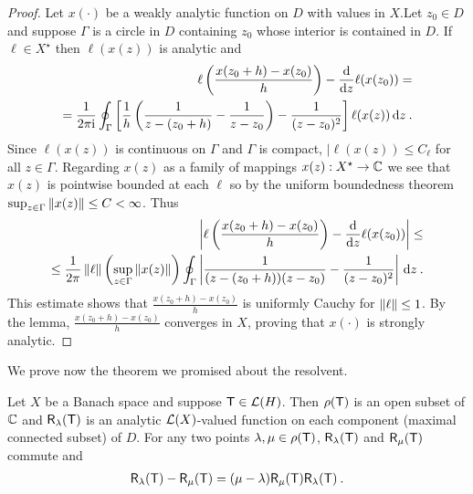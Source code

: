 \begin{proof}
    Let $x(\cdot)$ be a weakly analytic function on $D$ with values in $X$.Let $z_0 \in D$ and suppose $\Gamma$ is a circle in $D$ containing $z_0$ whose interior is contained in $D$. If $\ell \in X^\star$ then $\ell(x(z))$ is analytic and
    \begin{align}
        \ell \left( \frac{x(z_0+h)-x(z_0)}{h}\right) - \frac{\mathrm{d}}{\mathrm{d}z} \ell(x(z_0)) = \\
        = \frac{1}{2 \pi \mathrm{i}} \oint_\Gamma \left[ \frac{1}{h} \left( \frac{1}{z-(z_0+h)} - \frac{1}{z-z_0} \right) - \frac{1}{(z-z_0)^2} \right] \ell (x(z)) \, \mathrm{d} z \:.
    \end{align}
    Since $\ell(x(z))$ is continuous on $\Gamma$ and $\Gamma$ is compact, $|\ell(x(z)) \leq C_\ell$ for all $z \in \Gamma$. Regarding $x(z)$ as a family of mappings $x(z) : X^\star \to \mathbb{C}$ we see that $x(z)$ is pointwise bounded at each $\ell$ so by the uniform boundedness theorem $\sup_{z \in \Gamma} \left \Vert x(z) \right \Vert \leq C < \infty$. Thus \begin{align}
        \left| \ell \left( \frac{x(z_0+h)-x(z_0)}{h}\right) - \frac{\mathrm{d}}{\mathrm{d}z} \ell(x(z_0)) \right| \leq \\
        \leq \frac{1}{2 \pi} \left \Vert \ell \right \Vert \left( \sup_{z \in \Gamma} \left \Vert x(z) \right \Vert \right) \oint_\Gamma \left| \frac{1}{(z-(z_0+h))(z-z_0)} - \frac{1}{(z-z_0)^2}\right| \, \mathrm{d} z \:.
    \end{align}
    This estimate shows that $\frac{x(z_0+h)-x(z_0)}{h}$ is uniformly Cauchy for $\left \Vert \ell \right \Vert \leq 1$. By the lemma, $\frac{x(z_0+h)-x(z_0)}{h}$ converges in $X$, proving that $x(\cdot)$ is strongly analytic.
\end{proof}

We prove now the theorem we promised about the resolvent.

\begin{theorem}
    Let $X$ be a Banach space and suppose $\mathsf{T} \in \mathcal L(H)$. Then
$\rho(\mathsf{T})$ is an open subset of $\mathbb{C}$ and $\mathsf{R}_{\lambda}(\mathsf{T})$ is an analytic $\mathcal L(X)$-valued function on each component (maximal connected subset) of $D$. For any two points $\lambda, \mu \in \rho(\mathsf{T})$, $\mathsf{R}_\lambda(\mathsf{T})$ and $\mathsf{R}_\mu (\mathsf{T})$ commute and
\begin{align}
    \mathsf{R}_\lambda(\mathsf{T}) - \mathsf{R}_\mu (\mathsf{T}) = (\mu - \lambda) \mathsf{R}_\mu (\mathsf{T}) \mathsf{R}_\lambda (\mathsf{T}) \:.
\end{align}
\end{theorem}

